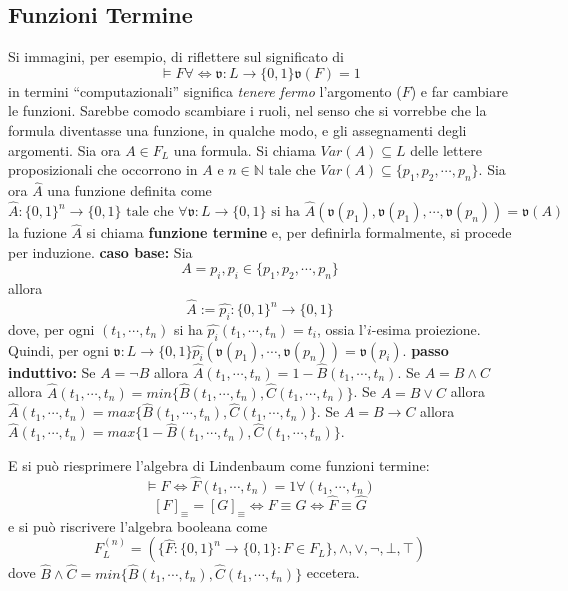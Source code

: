 \subsection{Funzioni Termine}
Si immagini, per esempio, di riflettere sul significato di 
$$
\models F \forall \iff \mathfrak{v}: L \rightarrow \{0,1\} \mathfrak{v}(F) = 1
$$
in termini ``computazionali'' significa \textit{tenere fermo} l'argomento 
($F$) e far cambiare le funzioni. Sarebbe comodo scambiare i ruoli, nel 
senso che si vorrebbe che la formula diventasse una funzione, in qualche modo,
e gli assegnamenti degli argomenti. 
Sia ora $A \in F_L$ una formula. Si chiama $Var(A) \subseteq L$ delle lettere 
proposizionali che occorrono in $A$ e $n \in \mathbb{N}$ tale che 
$Var(A) \subseteq \{p_1, p_2, \cdots, p_n\}$.  Sia ora $\hat{A}$ una funzione 
definita come 
$$
\hat{A} : \{0,1\}^n \rightarrow \{0,1\} \text{ tale che } \forall \mathfrak{v}:L \rightarrow \{0,1\}\text{ si ha } \hat{A}(\mathfrak{v}(p_1), \mathfrak{v}(p_1), \cdots, \mathfrak{v}(p_n)) = \mathfrak{v}(A)
$$
la fuzione $\hat{A}$ si chiama \textbf{funzione termine} e, per definirla formalmente, 
si procede per induzione. 
\textbf{caso base:} 
Sia 
$$
A = p_i, p_i \in \{p_1, p_2, \cdots, p_n\}
$$
allora 
$$
\hat{A} := \hat{p_i} : \{0,1\}^n \rightarrow \{0,1\}
$$ 
dove, per ogni $(t_1, \cdots, t_n)$ si ha $\hat{p_i}(t_1, \cdots, t_n) = t_i$, 
ossia l'$i$-esima proiezione. Quindi, per ogni 
$\mathfrak{v}: L \rightarrow \{0,1\} \hat{p_i}(\mathfrak{v}(p_1), \cdots, \mathfrak{v}(p_n)) = \mathfrak{v}(p_i)$. 
\noindent
\textbf{passo induttivo:}
Se $A = \neg B$ allora $\hat{A}(t_1, \cdots, t_n) =  1 - \hat{B}(t_1, \cdots, t_n)$. 
Se $A = B \land C$ allora $\hat{A}(t_1, \cdots, t_n) = min \{\hat{B}(t_1, \cdots, t_n), \hat{C}(t_1, \cdots, t_n)\}$. 
Se $A = B \lor C$ allora $\hat{A}(t_1, \cdots, t_n) = max \{\hat{B}(t_1, \cdots, t_n), \hat{C}(t_1, \cdots, t_n)\}$. 
Se $A = B \rightarrow C$ allora $\hat{A}(t_1, \cdots, t_n) = max \{1 - \hat{B}(t_1, \cdots, t_n), \hat{C}(t_1, \cdots, t_n)\}$. 

E si può riesprimere l'algebra di Lindenbaum come funzioni termine: 
$$
\models F \iff \hat{F}(t_1, \cdots, t_n) = 1 \forall (t_1, \cdots, t_n)
$$
$$
[F]_{\equiv} = [G]_{\equiv} \iff F \equiv G \iff \hat{F} \equiv \hat{G}
$$
e si può riscrivere l'algebra booleana come 
$$
F_L^{(n)} = (\{\hat{F}:\{0,1\}^n \rightarrow \{0,1\}: F \in F_L\}, \land, \lor, \neg, \bot, \top)
$$
dove 
$\hat{B} \land \hat{C} = min \{\hat{B}(t_1, \cdots, t_n), \hat{C}(t_1, \cdots, t_n)\}$
eccetera. 

